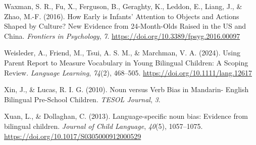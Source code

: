 \documentclass[10pt, letterpaper]{article}
\begin{document}
\begin{CSLReferences}{1}{0}
Waxman, S. R., Fu, X., Ferguson, B., Geraghty, K., Leddon, E., Liang,
J., \& Zhao, M.-F. (2016). How {Early} is {Infants}' {Attention} to
{Objects} and {Actions Shaped} by {Culture}? {New Evidence} from
24-{Month-Olds Raised} in the {US} and {China}. \emph{Frontiers in
Psychology}, \emph{7}. \url{https://doi.org/10.3389/fpsyg.2016.00097}

Weisleder, A., Friend, M., Tsui, A. S. M., \& Marchman, V. A. (2024).
Using {Parent Report} to {Measure Vocabulary} in {Young Bilingual
Children}: {A Scoping Review}. \emph{Language Learning}, \emph{74}(2),
468--505. \url{https://doi.org/10.1111/lang.12617}

Xin, J., \& Lucas, R. I. G. (2010). Noun versus {Verb Bias} in
{Mandarin- English Bilingual Pre-School Children}. \emph{TESOL Journal},
\emph{3}.

Xuan, L., \& Dollaghan, C. (2013). Language-specific noun bias: Evidence
from bilingual children. \emph{Journal of Child Language}, \emph{40}(5),
1057--1075. \url{https://doi.org/10.1017/S0305000912000529}

\end{CSLReferences}


\end{document}
